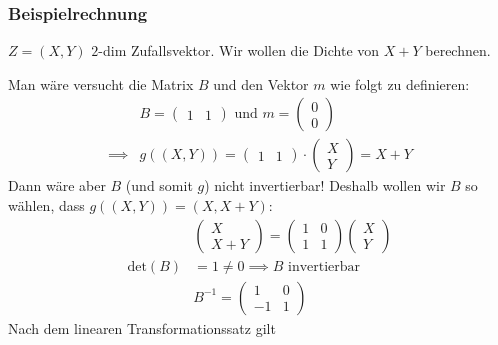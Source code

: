 \subsubsection*{Beispielrechnung}

$Z = (X, Y)$ $2$-dim Zufallsvektor. Wir wollen die Dichte von $X + Y$ berechnen.

Man wäre versucht die Matrix $B$ und den Vektor $m$ wie folgt zu definieren:
\begin{align*}
    &B= 
    \left(\begin{matrix}
        1 & 1
    \end{matrix}\right) 
    \text{ und } 
    m = \left(\begin{matrix}
        0\\
        0
    \end{matrix}\right)\\
    \implies &g((X,Y)) = 
    \left(\begin{matrix}
        1 & 1
    \end{matrix}\right) \cdot 
    \left(\begin{matrix}
        X\\
        Y
    \end{matrix}\right) = X + Y
\end{align*}
Dann wäre aber $B$ (und somit $g$) nicht invertierbar!
Deshalb wollen wir $B$ so wählen, dass $g((X,Y)) = (X, X + Y)$:
\begin{align*}
    &\left(\begin{matrix}
        X\\
        X + Y
    \end{matrix}\right) 
    = \left(\begin{matrix}
        1 & 0\\
        1 & 1
    \end{matrix}\right)
    \left(\begin{matrix}
        X\\
        Y
    \end{matrix}\right)\\
    \text{det}(B)&= 1 \neq 0 \implies B \text{ invertierbar}\\
    &B^{-1} = \left(\begin{matrix}
        1 & 0\\
        -1 & 1
    \end{matrix}\right)
\end{align*}
Nach dem linearen Transformationssatz gilt
